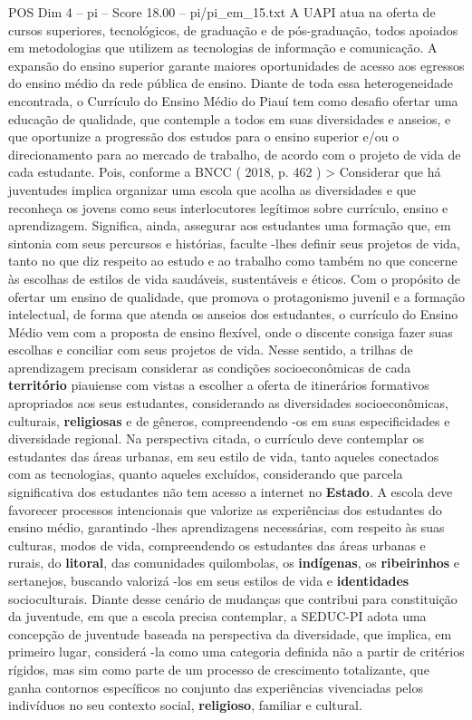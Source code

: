 \begin{textsample}{POS Dim 4 – pi – Score 18.00 – pi/pi\_em\_15.txt}
A UAPI atua na oferta de cursos superiores, tecnológicos, de graduação e de pós-graduação, todos apoiados em metodologias que utilizem as tecnologias de informação e comunicação.
A expansão do ensino superior garante maiores oportunidades de acesso aos egressos do ensino médio da rede pública de ensino.
Diante de toda essa heterogeneidade encontrada, o Currículo do Ensino Médio do Piauí tem como desafio ofertar uma educação de qualidade, que contemple a todos em suas diversidades e anseios, e que oportunize a progressão dos estudos para o ensino superior e/ou o direcionamento para ao mercado de trabalho, de acordo com o projeto de vida de cada estudante.
Pois, conforme a BNCC ( 2018, p. 462 ) > Considerar que há juventudes implica organizar uma escola que acolha as diversidades e que reconheça os jovens como seus interlocutores legítimos sobre currículo, ensino e aprendizagem.
Significa, ainda, assegurar aos estudantes uma formação que, em sintonia com seus percursos e histórias, faculte -lhes definir seus projetos de vida, tanto no que diz respeito ao estudo e ao trabalho como também no que concerne às escolhas de estilos de vida saudáveis, sustentáveis e éticos.
Com o propósito de ofertar um ensino de qualidade, que promova o protagonismo juvenil e a formação intelectual, de forma que atenda os anseios dos estudantes, o currículo do Ensino Médio vem com a proposta de ensino flexível, onde o discente consiga fazer suas escolhas e conciliar com seus projetos de vida.
Nesse sentido, a trilhas de aprendizagem precisam considerar as condições socioeconômicas de cada \textbf{território} piauiense com vistas a escolher a oferta de itinerários formativos apropriados aos seus estudantes, considerando as diversidades socioeconômicas, culturais, \textbf{religiosas} e de gêneros, compreendendo -os em suas especificidades e diversidade regional.
Na perspectiva citada, o currículo deve contemplar os estudantes das áreas urbanas, em seu estilo de vida, tanto aqueles conectados com as tecnologias, quanto aqueles excluídos, considerando que parcela significativa dos estudantes não tem acesso a internet no \textbf{Estado}.
A escola deve favorecer processos intencionais que valorize as experiências dos estudantes do ensino médio, garantindo -lhes aprendizagens necessárias, com respeito às suas culturas, modos de vida, compreendendo os estudantes das áreas urbanas e rurais, do \textbf{litoral}, das comunidades quilombolas, os \textbf{indígenas}, os \textbf{ribeirinhos} e sertanejos, buscando valorizá -los em seus estilos de vida e \textbf{identidades} socioculturais.
Diante desse cenário de mudanças que contribui para constituição da juventude, em que a escola precisa contemplar, a SEDUC-PI adota uma concepção de juventude baseada na perspectiva da diversidade, que implica, em primeiro lugar, considerá -la como uma categoria definida não a partir de critérios rígidos, mas sim como parte de um processo de crescimento totalizante, que ganha contornos específicos no conjunto das experiências vivenciadas pelos indivíduos no seu contexto social, \textbf{religioso}, familiar e cultural.

\end{textsample}
